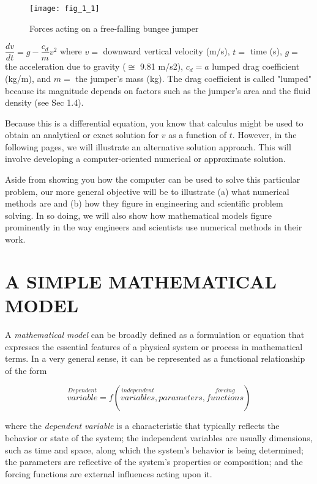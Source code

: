 \documentclass[../main.tex]{subfiles}
\begin{document}
    
\begin{wrapfigure}{l}{0.25\textwidth}
    \centering
    \texttt{[image: fig\_1\_1]}
   \caption{\textsf{Forces acting on a free-falling bungee jumper}}

\end{wrapfigure}



$\dfrac{dv}{dt}=g-\dfrac{c_d}{m}v^2$
where $v =$ downward vertical velocity (m/s), $t =$ time (s), $g =$ the acceleration due to
gravity ($\cong$ 9.81 m/s2), $c_d = a$ lumped drag coefficient (kg/m), and $m =$ the jumper's
mass (kg). The drag coefficient is called "lumped" because its magnitude depends on factors such as the jumper's area and the fluid density (see Sec 1.4).


Because this is a differential equation, you know that calculus might be used to obtain
an analytical or exact solution for $v$ as a function of $t$. However, in the following pages, we
will illustrate an alternative solution approach. This will involve developing a computer-oriented numerical or approximate solution.


Aside from showing you how the computer can be used to solve this particular problem, our more general objective will be to illustrate (a) what numerical methods are and
(b) how they figure in engineering and scientific problem solving. In so doing, we will also
show how mathematical models figure prominently in the way engineers and scientists use
numerical methods in their work.


\bigskip
\section{A SIMPLE MATHEMATICAL MODEL}
\label{sec:sec1}
  A \textsl{mathematical model} can be broadly defined as a formulation or equation that expresses
the essential features of a physical system or process in mathematical terms. In a very general sense, 
it can be represented as a functional relationship of the form


\begin{equation}
\tag{1.1}
\overset{Dependent}{variable} = f \left( \overset{independent}{variables},parameters,\overset{forcing}{functions}\right)  
\end{equation}
 
where the \textsl{dependent variable} is a characteristic that typically reflects the behavior or state
of the system; the independent variables are usually dimensions, such as time and space,
along which the system's behavior is being determined; the parameters are reflective of the
system's properties or composition; and the forcing functions are external influences acting
upon it.
\end{document}
